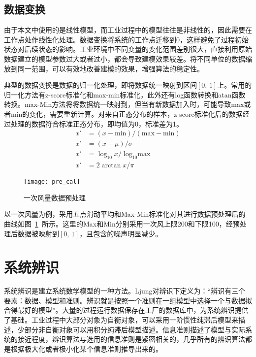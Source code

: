 \subsection{数据变换}

由于本文中使用的是线性模型，而工业过程中的模型往往是非线性的，因此需要在工作点处作线性化处理。数据变换将系统的工作点迁移到0，这样避免了过程初始状态对后续状态的影响。工业环境中不同变量的变化范围差别很大，直接利用原始数据建立的模型参数过大或者过小，都会导致建模效果较差。将不同单位的数据缩放到同一范围，可以有效地改善建模的效果，增强算法的稳定性。

典型的数据变换是数据的归一化处理，即将数据统一映射到区间$[0,\,  1]$上。常用的归一化方法有z-score标准化和max-min标准化，此外还有log函数转换和atan函数转换。max-Min方法将将数据统一映射到，但当有新数据加入时，可能导致max或者min的变化，需要重新计算。对来自正态分布的样本，z-score标准化后的数据经过处理的数据符合标准正态分布，即均值为0，标准差为1。
\begin{align}
x'&=(x - \textrm{min})/(\textrm{max}- \textrm{min}) \\
x'&=(x - \mu)/{\sigma} \\
x'&={\log_{10}{x}}/{\log_{10}{\textrm{max}}}\\
x'&={2\arctan{x}}/{\pi}
\end{align}

\begin{figure}[!htb]
\centering
\texttt{[image: pre\_cal]}
\caption{一次风量数据预处理} \label{fig:pre_cal}
\end{figure}

以一次风量为例，采用五点滑动平均和Max-Min标准化对其进行数据预处理后的曲线如图~\ref{fig:pre_cal}~所示。这里的Max和Min分别采用一次风上限200和下限100，经预处理后数据被映射到$[0,\, 1]$，且包含的噪声明显减少。



\section{系统辨识}
\label{sec:mod_ide}

系统辨识是建立系统数学模型的一种方法。Ljung对辨识下定义为：“辨识有三个要素：数据、模型和准则。辨识就是按照一个准则在一组模型中选择一个与数据拟合得最好的模型”。大量的过程运行数据保存在工厂的数据库中，为系统辨识提供了基础。工业过程中大部分对象为自衡对象，可以采用一阶惯性纯滞后模型来描述，少部分非自衡对象可以用积分纯滞后模型描述。信息准则描述了模型与实际系统的接近程度，辨识算法与选用的信息准则是紧密相关的，几乎所有的辨识算法都是根据极大化或者极小化某个信息准则推导出来的\cite{陈霸东2011系统参数辨识的信息准则及算法}。

